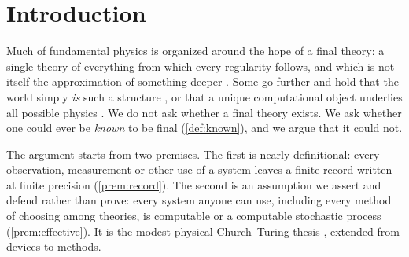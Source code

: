 \section{Introduction}\label{sec:intro}

Much of fundamental physics is organized around the hope of a final theory: a single
theory of everything from which every regularity follows, and which is not itself
the approximation of something deeper \citep{weinberg1992}. Some go further and hold
that the world simply \emph{is} such a structure \citep{tegmark2008}, or that a unique
computational object underlies all possible physics \citep{wolfram-ruliad2021}. We do
not ask whether a final theory exists. We ask whether one could ever be \emph{known} to
be final (\cref{def:known}), and we argue that it could not.

The argument starts from two premises. The first is nearly definitional: every
observation, measurement or other use of a system leaves a finite record written at
finite precision (\cref{prem:record}). The second is an assumption we assert and defend
rather than prove: every system anyone can use, including every method of choosing
among theories, is computable or a computable stochastic process (\cref{prem:effective}).
It is the modest physical Church--Turing thesis \citep{piccinini2011}, extended from
devices to methods.

